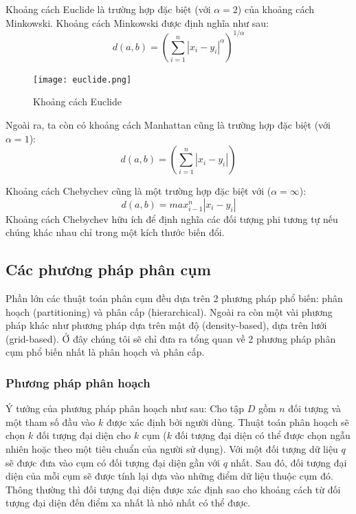 \documentclass{article}
\begin{document}
    Khoảng cách Euclide là trường hợp đặc biệt (với $\alpha = 2$) của khoảng cách Minkowski. Khoảng cách Minkowski được định nghĩa như sau:
    $$d(a,b) = \left(\sum\limits_{i=1}^n |x_i-y_i|^\alpha\right)^{1/\alpha}$$

    \begin{figure}[H]
        \centering            
        \texttt{[image: euclide.png]} \\
        \caption{Khoảng cách Euclide}
        \label{fig:euclide}
    \end{figure}

    Ngoài ra, ta còn có khoảng cách Manhattan cũng là trường hợp đặc biệt (với $\alpha = 1$):
    $$d(a,b) = \left(\sum\limits_{i=1}^n |x_i-y_i|\right)$$

    Khoảng cách Chebychev cũng là một trường hợp đặc biệt với ($\alpha = \infty$):
    $$d(a,b) = max_{i-1}^n|x_i-y_i|$$
    Khoảng cách Chebychev hữu ích để định nghĩa các đối tượng phi tương tự nếu chúng khác nhau chỉ trong một kích thước biến đổi.
    
    \subsection{Các phương pháp phân cụm}
    Phần lớn các thuật toán phân cụm đều dựa trên 2 phương pháp phổ biến: phân hoạch (partitioning) và phân cấp (hierarchical). Ngoài ra còn một vài phương pháp khác như phương pháp dựa trên mật độ (density-based), dựa trên lưới (grid-based). Ở đây chúng tôi sẽ chỉ đưa ra tổng quan về 2 phương pháp phân cụm phổ biến nhất là phân hoạch và phân cấp.
    \subsubsection{Phương pháp phân hoạch}
    Ý tưởng của phương pháp phân hoạch như sau: Cho tập $D$ gồm $n$ đối tượng và một tham số đầu vào $k$ được xác định bởi người dùng. Thuật toán phân hoạch sẽ chọn $k$ đối tượng đại diện cho $k$ cụm ($k$ đối tượng đại diện có thể được chọn ngẫu nhiên hoặc theo một tiêu chuẩn của người sử dụng). Với một đối tượng dữ liệu $q$ sẽ được đưa vào cụm có đối tượng đại diện gần với $q$ nhất. Sau đó, đối tượng đại diện của mỗi cụm sẽ được tính lại dựa vào những điểm dữ liệu thuộc cụm đó. Thông thường thì đối tượng đại diện được xác định sao cho khoảng cách từ đối tượng đại diện đến điểm xa nhất là nhỏ nhất có thể được.
\end{document}
